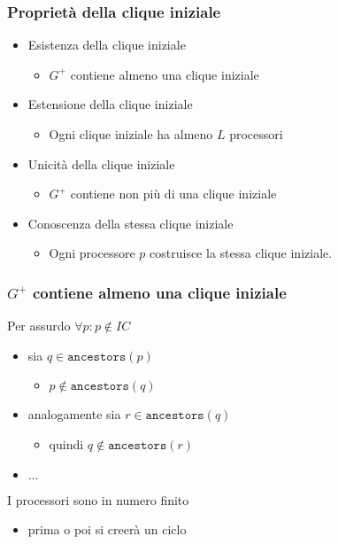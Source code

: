 \documentclass{beamer}
\begin{document}
\begin{frame}\frametitle{Proprietà della clique iniziale}
\begin{itemize}
\item Esistenza della clique iniziale
	\begin{itemize}\item $G^+$ contiene almeno una clique iniziale\end{itemize}
\item Estensione della clique iniziale
	\begin{itemize}\item Ogni clique iniziale ha almeno $L$ processori\end{itemize}
\item Unicità della clique iniziale
	\begin{itemize}\item $G^+$ contiene non più di una clique iniziale\end{itemize}
\item Conoscenza della stessa clique iniziale
	\begin{itemize}\item Ogni processore $p$ costruisce la stessa clique iniziale.\end{itemize}
\end{itemize}
\end{frame}


\begin{frame}\frametitle{$G^+$ contiene almeno una clique iniziale}
Per assurdo $\forall p: p\not\in IC$
\begin{itemize}
\item sia $q \in \texttt{ancestors}(p)$
\begin{itemize}
\item $p \not \in \texttt{ancestors}(q)$
\end{itemize}
\item analogamente sia $r \in \texttt{ancestors}(q)$ 
\begin{itemize}
\item quindi $q \not  \in \texttt{ancestors}(r)$
\end{itemize} 
\item $\ldots$
\end{itemize}
\begin{figure}\centering\end{figure}
I processori sono in numero finito
\begin{itemize}
\item prima o poi si creerà un ciclo
\end{itemize}
\end{frame}
\end{document}
